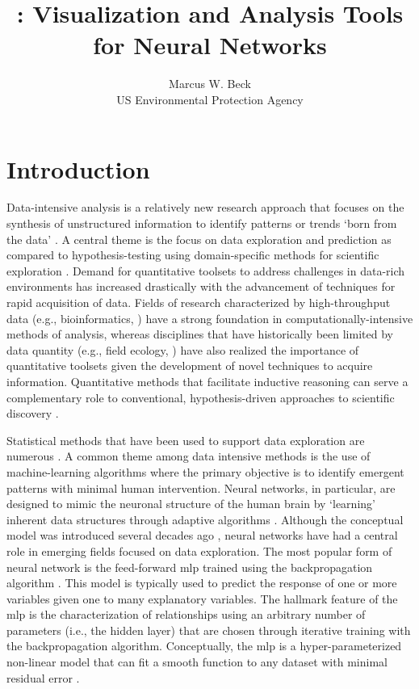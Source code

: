 \documentclass[article,shortnames]{jss}
\author{Marcus W. Beck\\US Environmental Protection Agency}
\title{\pkg{NeuralNetTools}: Visualization and Analysis Tools for Neural Networks}
\begin{document}

\section[Introduction]{Introduction}

Data-intensive analysis is a relatively new research approach that focuses on the synthesis of unstructured information to identify patterns or trends `born from the data' \citep{Bell09,Kelling09,Michener12}.  A central theme is the focus on data exploration and prediction as compared to hypothesis-testing using domain-specific methods for scientific exploration \citep{Kell03}.  Demand for quantitative toolsets to address challenges in data-rich environments has increased drastically with the advancement of techniques for rapid acquisition of data. Fields of research characterized by high-throughput data (e.g., bioinformatics, \citet{Saeys07}) have a strong foundation in computationally-intensive methods of analysis, whereas disciplines that have historically been limited by data quantity (e.g., field ecology, \citet{Swanson15}) have also realized the importance of quantitative toolsets given the development of novel techniques to acquire information.  Quantitative methods that facilitate inductive reasoning can serve a complementary role to conventional, hypothesis-driven approaches to scientific discovery \citep{Kell03}.  

Statistical methods that have been used to support data exploration are numerous \citep{Jain00,Recknagel06,Zuur10}.  A common theme among data intensive methods is the use of machine-learning algorithms where the primary objective is to identify emergent patterns with minimal human intervention.  Neural networks, in particular, are designed to mimic the neuronal structure of the human brain by `learning' inherent data structures through adaptive algorithms \citep{Rumelhart86,Ripley96}.  Although the conceptual model was introduced several decades ago \citep{McCulloch43}, neural networks have had a central role in emerging fields focused on data exploration.  The most popular form of neural network is the feed-forward \ac{mlp} trained using the backpropagation algorithm \citep{Rumelhart86}.  This model is typically used to predict the response of one or more variables given one to many explanatory variables.  The hallmark feature of the \ac{mlp} is the characterization of relationships using an arbitrary number of parameters (i.e., the hidden layer) that are chosen through iterative training with the backpropagation algorithm.  Conceptually, the \ac{mlp} is a hyper-parameterized non-linear model that can fit a smooth function to any dataset with minimal residual error \citep{Hornik91}.
\end{document}
